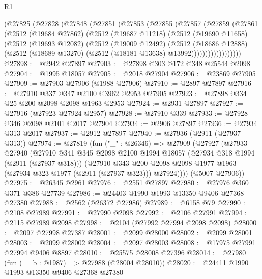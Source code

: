 \begin{lexlean}{R1}
\begin{coremodule}
      (@27825
        (@27828
          (@27848
            (@27851
              (@27853
                (@27855
                  (@27857
                    (@27859
                      (@27861
                        (@2512
                          (@19684 @27862)
                          (@2512
                            (@19687 @11218)
                            (@2512
                              (@19690 @11658)
                              (@2512
                                (@19693 @12082)
                                (@2512
                                  (@19009 @12492)
                                  (@2512
                                    (@18686 @12888)
                                    (@2512
                                      (@18689 @13270)
                                      (@2512 (@18181 @13638) @13992))))))))))))))))))
@27898 := @2942 @27897
@27903 := @27898 @303 @172 @348 @25544 @2098
@27904 := @1995 @18057
@27905 := @2018 @27904
@27906 := @23869 @27905
@27909 := @27903 @27906 (@1988 @27906)
@27910 := @2897 @27897
@27916 := @27910 @337 @347 @2100 @3962 @2953 @27905
@27923 := @27898 @334 @25 @200 @2098 @2098 @1963 @2953
@27924 := @2931 @27897
@27927 := @27916 (@27923 @27924 @2957)
@27928 := @27910 @339
@27933 := @27928 @346 @2098 @2101 @2017 @27904
@27934 := @2906 @27897
@27936 := @27934 @313 @2017
@27937 := @2912 @27897
@27940 := @27936 (@2911 (@27937 @313))
@27974 := @27819
    (fun ("_" : @26346) =>
    @27909
      (@27927
        (@27933
          @27940
          (@27910
            @341
            @345
            @2098
            @2100
            @1994
            @18057
            (@27934 @318 @1994 (@2911 (@27937 @318)))
            (@27910
              @343
              @200
              @2098
              @2098
              @1977
              @1963
              (@27934 @323 @1977 (@2911 (@27937 @323)))
              @27924))))
      (@5007 @27906))
@27975 := @26345 @2961
@27976 := @2551 @27897
@27980 := @27976 @360 @371 @386 @27739
@27986 := @24403 @1990 @1993 @13350 @9406 @27368 @27380
@27988 := @2562 (@26372 @27986)
@27989 := @6158 @79
@27990 := @2108 @27989
@27991 := @27990 @2098
@27992 := @2106 @27991
@27994 := @2115 @27989 @2098
@27998 := @2104 (@27992 @27994 @2098 @2098)
@28000 := @2097 @27998 @27387
@28001 := @2099 @28000
@28002 := @2099 @28001
@28003 := @2099 @28002
@28004 := @2097 @28003
@28008 := @17975 @27991 @27994 @9406 @8897
@28010 := @25575 @28008 @27396
@28014 := @27980 (fun (__b : @1987) => @27988 (@28004 @28010))
@28020 := @24411 @1990 @1993 @13350 @9406 @27368 @27380

\end{coremodule}
\end{lexlean}
